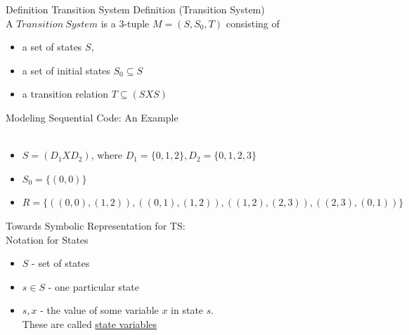 \documentclass{beamer}
\begin{document}
\begin{frame}{Definition Transition System}
Definition (Transition System) \\
A $Transition~System$ is a 3-tuple $M = (S, S_0, T)$ consisting of
\begin{itemize}
\item a set of states $S$,

\item a set of initial states $S_0 \subseteq S$\item a transition relation $T \subseteq (S X S)$
\end{itemize}
\end{frame}

\begin{frame}{Modeling Sequential Code: An Example}
\hfill
{} \\
 \\
\begin{itemize}
\item<3-> $S = (D_1 X D_2)$, where $D_1 = \{0,1,2\}, D_2 = \{0,1,2,3\}$
\item<3-> $S_0 = \{(0,0)\}$
\item<3-> $R = \{ ((0,0),(1,2)), ((0,1),(1,2)), ((1,2),(2,3)), ((2,3),(0,1))  \}$
\end{itemize}
\end{frame}

\begin{frame}{Towards Symbolic Representation for TS:\\
Notation for States}
\begin{itemize}
\item $S$ - set of states

\item $s \in S$ - one particular state

\item $s,x$ - the value of some variable $x$ in state $s$. \\
These are called \underline{state variables}
\end{itemize}
\end{frame}
\end{document}
